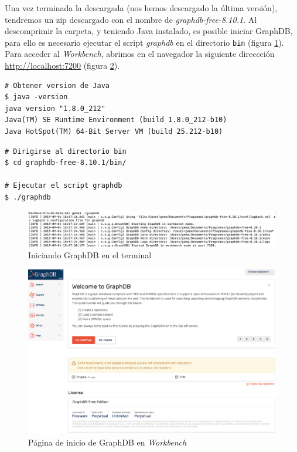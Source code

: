 Una vez terminada la descargada (nos hemos descargado la última versión), tendremos un zip descargado con el nombre de \textit{graphdb-free-8.10.1}. Al descomprimir la carpeta, y teniendo Java instalado, es posible iniciar GraphDB, para ello es necesario ejecutar el script \textit{graphdb} en el directorio \texttt{bin} (figura \ref{fig:4}). Para acceder al \textit{Workbench}, abrimos en el navegador la siguiente direccción \url{http://localhost:7200} (figura \ref{fig:5}).\\

\begin{lstlisting}
# Obtener version de Java
$ java -version
java version "1.8.0_212"
Java(TM) SE Runtime Environment (build 1.8.0_212-b10)
Java HotSpot(TM) 64-Bit Server VM (build 25.212-b10)
\end{lstlisting}

\begin{lstlisting}
# Dirigirse al directorio bin
$ cd graphdb-free-8.10.1/bin/

# Ejecutar el script graphdb 
$ ./graphdb
\end{lstlisting}

\begin{figure}[H]
	\centering
	\includegraphics[width=1\linewidth]{imagenes/apendices/4}
	\caption{Iniciando GraphDB en el terminal}
	\label{fig:4}
\end{figure}


\begin{figure}[H]
	\centering
	\includegraphics[width=1\linewidth]{imagenes/apendices/5}
	\caption{Página de inicio de GraphDB en \textit{Workbench}}
	\label{fig:5}
\end{figure}

